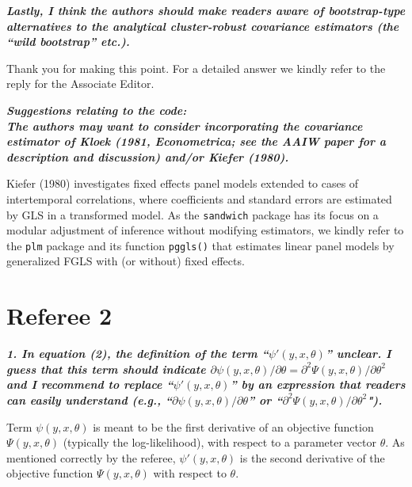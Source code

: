 \documentclass[10pt,a4paper]{article}
\begin{document}
\medskip

\textbf{\textit{Lastly, I think the authors should make readers aware of bootstrap-type alternatives to the analytical cluster-robust covariance estimators (the ``wild bootstrap'' etc.).}}

\medskip

Thank you for making this point. For a detailed answer we kindly refer to the reply for the Associate Editor. 

\medskip

\textbf{\textit{Suggestions relating to the code:
\\
The authors may want to consider incorporating the  covariance estimator of Kloek (1981, Econometrica; see the AAIW paper for a description and discussion) and/or Kiefer (1980).}}

\medskip

Kiefer (1980) investigates fixed effects panel models extended to cases of intertemporal correlations, where coefficients and standard errors are estimated by GLS in a transformed model. As the \texttt{sandwich} package has its focus on a modular adjustment of inference without modifying estimators, we kindly refer to the \texttt{plm} package and its function \texttt{pggls()} that estimates linear panel models by generalized FGLS with (or without) fixed effects.

\bigskip

\section*{Referee 2}

\textbf{\textit{1. In equation (2), the definition of the term ``$\psi'(y, x, \theta)$'' unclear.
I guess that this term should indicate $\partial \psi(y, x, \theta)/\partial\theta = \partial^2\Psi(y, x, \theta)/\partial\theta^2$ and I recommend to replace ``$\psi'(y, x, \theta)$''
by an expression that readers can easily understand
(e.g., ``$\partial \psi(y, x, \theta)/\partial\theta$'' or ``$\partial^2\Psi(y, x, \theta)/\partial\theta^2$").}}

\medskip

Term $\psi(y, x, \theta)$ is meant to be the first derivative of an objective function $\Psi(y, x, \theta)$ (typically the log-likelihood), with respect to a parameter vector $\theta$. As mentioned correctly by the referee, $\psi'(y, x, \theta)$ is the second derivative of the objective function $\Psi(y, x, \theta)$ with respect to $\theta$.
\end{document}
